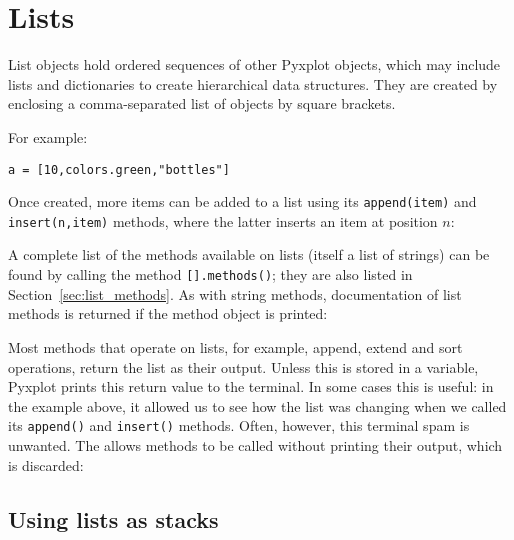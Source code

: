 \section{Lists}

List objects hold ordered sequences of other Pyxplot objects, which may
include lists and dictionaries to create hierarchical data structures. They are
created by enclosing a comma-separated list of objects by square brackets.

For example:

\begin{verbatim}
a = [10,colors.green,"bottles"]
\end{verbatim}

Once created, more items can be added to a list using its {\tt append(item)}
and {\tt insert(n,item)} methods, where the latter inserts an item at position
$n$:

\vspace{3mm}

\vspace{3mm}

\noindent
A complete list of the methods available on lists (itself a list of strings)
can be found by calling the method {\tt [].methods()}; they are also listed in
Section~\ref{sec:list_methods}. As with string methods, documentation of list
methods is returned if the method object is printed:

\vspace{3mm}

\vspace{3mm}

Most methods that operate on lists, for example, append, extend and sort
operations, return the list as their output. Unless this is stored in a
variable, Pyxplot prints this return value to the terminal. In some cases this
is useful: in the example above, it allowed us to see how the list was changing
when we called its {\tt append()} and {\tt insert()} methods. Often, however,
this terminal spam is unwanted. The  allows methods to be called
without printing their output, which is discarded:

\vspace{3mm}

\vspace{3mm}

\subsection{Using lists as stacks}

